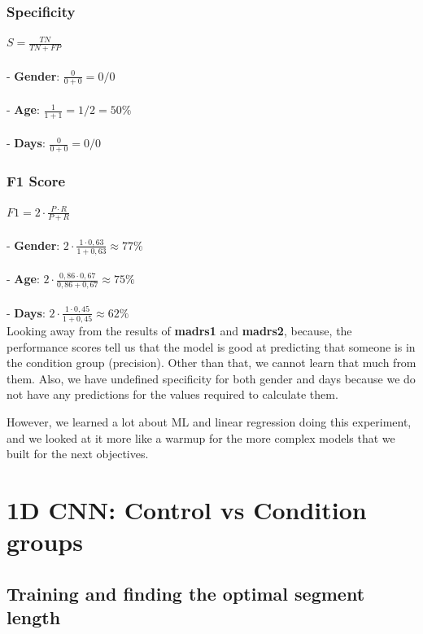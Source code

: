 \subsubsection{Specificity}
$ S = \frac{TN}{TN+FP} $
\\\\
- \textbf{Gender}: $\frac{0}{0+0} = 0/0$\\\\
- \textbf{Age}: $\frac{1}{1+1} = 1/2 = 50\%$\\\\
- \textbf{Days}: $\frac{0}{0+0} = 0/0$\\

\subsubsection{F1 Score}
$ F1 = 2 \cdot \frac{P \cdot R}{P + R} $
\\\\
- \textbf{Gender}: $2 \cdot \frac{1 \cdot 0,63}{1 + 0,63} \approx 77\%$\\\\
- \textbf{Age}: $2 \cdot \frac{0,86 \cdot 0,67}{0,86 + 0,67} \approx 75\%$\\\\
- \textbf{Days}: $2 \cdot \frac{1 \cdot 0,45}{1 + 0,45} \approx 62\%$\\

Looking away from the results of \textbf{madrs1} and \textbf{madrs2}, because, the performance scores tell us that the model is good at predicting that someone is in the condition group (precision). Other than that, we cannot learn that much from them. Also, we have undefined specificity for both gender and days because we do not have any predictions for the values required to calculate them. 

However, we learned a lot about ML and linear regression doing this experiment, and we looked at it more like a warmup for the more complex models that we built for the next objectives.

\section{1D CNN: Control vs Condition groups}

\subsection{Training and finding the optimal segment length}

